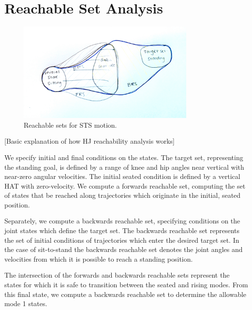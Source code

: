 \section{Reachable Set Analysis}

\begin{figure}
	\centering
	\includegraphics[width=3.5in]{figures/reachableSets.jpg}
	\caption{Reachable sets for STS motion.}
	\label{fig:hybrid}
\end{figure}

[Basic explanation of how HJ reachability analysis works]

We specify initial and final conditions on the states. The target set, representing the standing goal, is defined by a range of knee and hip angles near vertical with near-zero angular velocities. The initial seated condition is defined by a vertical HAT with zero-velocity. We compute a forwards reachable set, computing the set of states that be reached along trajectories which originate in the initial, seated position.

Separately, we compute a backwards reachable set, specifying conditions on the joint states which define the target set. The backwards reachable set represents the set of initial conditions of trajectories which enter the desired target set. In the case of sit-to-stand the backwards reachable set denotes the joint angles and velocities from which it is possible to reach a standing position. 

The intersection of the forwards and backwards reachable sets represent the states for which it is safe to transition between the seated and rising modes. From this final state, we compute a backwards reachable set to determine the allowable mode 1 states.